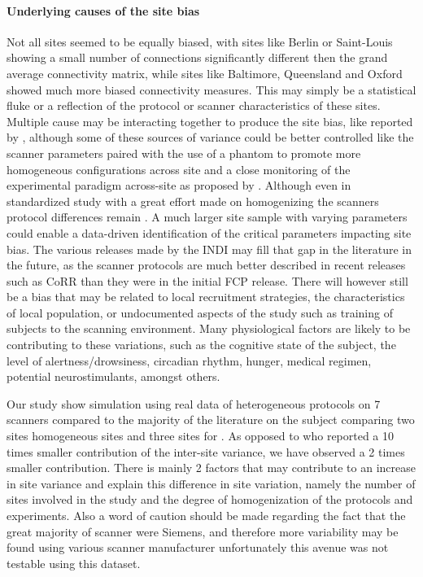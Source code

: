 \documentclass[authoryear]{elsarticle}
\begin{document}
\paragraph{Underlying causes of the site bias}

Not all sites seemed to be equally biased, with sites like Berlin or Saint-Louis showing a small number of connections significantly different then the grand average connectivity matrix, while sites like Baltimore, Queensland and Oxford showed much more biased connectivity measures. This may simply be a statistical fluke or a reflection of the protocol or scanner characteristics of these sites. Multiple cause may be interacting together to produce the site bias, like reported by \cite{Yan2013a}, although some of these sources of variance could be better controlled like the scanner parameters paired with the use of a phantom to promote more homogeneous configurations across site and a close monitoring of the experimental paradigm across-site as proposed by \cite{Friedman2006,Friedman2006a,Glover2012}. Although even in standardized study with a great effort made on homogenizing the scanners protocol differences remain \cite{Brown2011}. A much larger site sample with varying parameters could enable a data-driven identification of the critical parameters impacting site bias. The various releases made by the INDI may fill that gap in the literature in the future, as the scanner protocols are much better described in recent releases such as CoRR than they were in the initial FCP release. There will however still be a bias that may be related to local recruitment strategies, the characteristics of local population, or undocumented aspects of the study such as training of subjects to the scanning environment. Many physiological factors are likely to be contributing to these variations, such as the cognitive state of the subject, the level of alertness/drowsiness, circadian rhythm, hunger, medical regimen, potential neurostimulants, amongst others. 

Our study show simulation using real data of heterogeneous protocols on 7 scanners compared to the majority of the literature on the subject comparing two sites homogeneous sites \citep{Costafreda2007,Suckling2008,Sutton2008,Glover2012} and three sites for \cite{Gountouna2010}. As opposed to \cite{Sutton2008,Brown2011} who reported a 10 times smaller contribution of the inter-site variance, we have observed a 2 times smaller contribution. There is mainly 2 factors that may contribute to an increase in site variance and explain this difference in site variation, namely the number of sites involved in the study and the degree of homogenization of the protocols and experiments. Also a word of caution should be made regarding the fact that the great majority of scanner were Siemens, and therefore more variability may be found using various scanner manufacturer unfortunately this avenue was not testable using this dataset.
\end{document}
